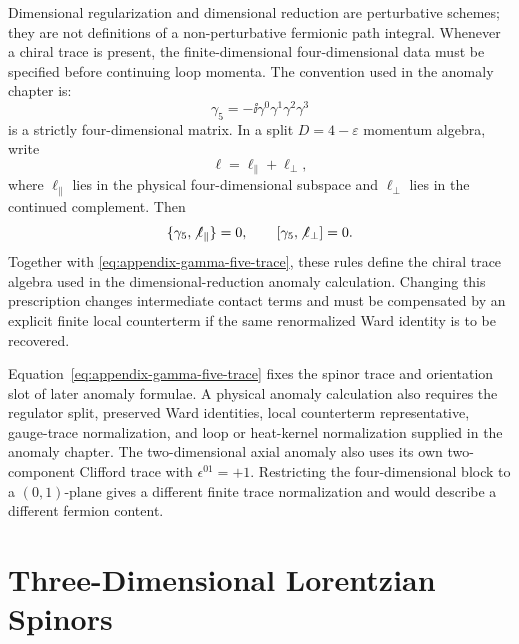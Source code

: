 \begin{definition}
\label{def:dimensional-reduction-chiral-trace-prescription}
Dimensional regularization and dimensional reduction are perturbative
schemes; they are not definitions of a non-perturbative fermionic path
integral.  Whenever a chiral trace is present, the finite-dimensional
four-dimensional data must be specified before continuing loop momenta.
The convention used in the anomaly chapter is:
\[
  \gamma_5=-\ii\gamma^0\gamma^1\gamma^2\gamma^3
\]
is a strictly four-dimensional matrix.  In a split
\(D=4-\varepsilon\) momentum algebra, write
\[
  \ell=\ell_\parallel+\ell_\perp,
\]
where \(\ell_\parallel\) lies in the physical four-dimensional subspace and
\(\ell_\perp\) lies in the continued complement.  Then
\[
  \{\gamma_5,\not\ell_\parallel\}=0,
  \qquad
  [\gamma_5,\not\ell_\perp]=0 .
\]
Together with \eqref{eq:appendix-gamma-five-trace}, these rules define the
chiral trace algebra used in the dimensional-reduction anomaly calculation.
Changing this prescription changes intermediate contact terms and must be
compensated by an explicit finite local counterterm if the same renormalized
Ward identity is to be recovered.
\end{definition}

\begin{remark}
\label{rem:finite-chiral-trace-scope}
Equation~\eqref{eq:appendix-gamma-five-trace} fixes the spinor trace and
orientation slot of later anomaly formulae.  A physical anomaly calculation
also requires the regulator split, preserved Ward identities, local
counterterm representative, gauge-trace normalization, and loop or
heat-kernel normalization supplied in the anomaly chapter.
The two-dimensional axial anomaly also uses its own two-component Clifford
trace with \(\epsilon^{01}=+1\).  Restricting the four-dimensional block to a
\((0,1)\)-plane gives a different finite trace normalization and would
describe a different fermion content.
\end{remark}

\section{Three-Dimensional Lorentzian Spinors}

